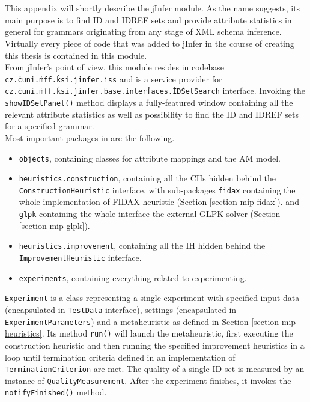 \chapter{}
\label{appendix-iss}


This appendix will shortly describe the  jInfer module. As the name suggests, its main purpose is to find ID and IDREF sets and provide attribute statistics in general for grammars originating from any stage of XML schema inference. Virtually every piece of code that was added to jInfer in the course of creating this thesis is contained in this module.\\

From jInfer's point of view, this module resides in codebase \texttt{cz.\.cuni.\.mff.\.ksi.\.jinfer.\.iss} and is a service provider for \texttt{cz.\.cuni.\.mff.\.ksi.\.jinfer.\.base.\.inter\.faces.\.ID\.Set\.Search} interface. Invoking the \texttt{showIDSetPanel()} method displays a fully-featured window containing all the relevant attribute statistics as well as possibility to find the ID and IDREF sets for a specified grammar.\\

Most important packages in  are the following.

\begin{itemize}
	\item \texttt{objects}, containing classes for attribute mappings and the AM model.
	\item \texttt{heuristics.construction}, containing all the CHs hidden behind the \texttt{Con\-struc\-tion\-Heu\-ris\-tic} interface, with sub-packages \texttt{fidax} containing the whole implementation of FIDAX heuristic (Section \ref{section-mip-fidax}).
	and \texttt{glpk} containing the whole interface the external GLPK solver (Section \ref{section-mip-glpk}).
	\item \texttt{heuristics.improvement}, containing all the IH hidden behind the \texttt{Im\-prove\-ment\-Heu\-ris\-tic} interface.
	\item \texttt{experiments}, containing everything related to experimenting.
\end{itemize}

\texttt{Experiment} is a class representing a single experiment with specified input data (encapsulated in \texttt{Test\-Data} interface), settings (encapsulated in \texttt{Ex\-pe\-ri\-ment\-Pa\-ra\-me\-ters}) and a metaheuristic as defined in Section \ref{section-mip-heuristics}. Its method \texttt{run()} will launch the metaheuristic, first executing the construction heuristic and then running the specified improvement heuristics in a loop until termination criteria defined in an implementation of \texttt{Ter\-mi\-na\-tion\-Cri\-ter\-ion} are met. The quality of a single ID set is measured by an instance of \texttt{Quality\-Measurement}. After the experiment finishes, it invokes the \texttt{notify\-Finished()} method.

